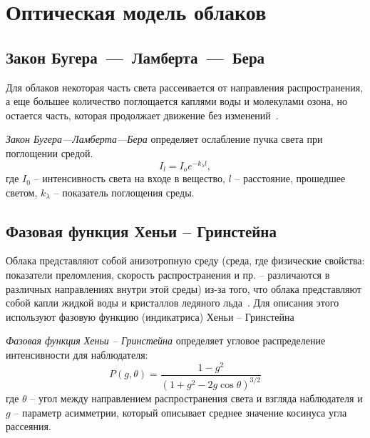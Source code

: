 \section{Оптическая модель облаков}
\subsection{Закон Бугера~---~Ламберта~---~Бера}
Для облаков некоторая часть света рассеивается от направления распространения, а еще большее количество поглощается каплями воды и молекулами озона, но остается часть, которая продолжает движение без изменений~\cite{guerrilla_volumetric_cloudscapes_2023, sym10040125}.

\textit{Закон Бугера---Ламберта---Бера} определяет ослабление пучка света при поглощении средой.
\begin{equation}
	\label{eq:beers-law}
	I_l=I_{o}e^{-k_{\lambda }l},
\end{equation} где 
{$I_{0}$} -- интенсивность света на входе в вещество, 
$l$ -- расстояние, прошедшее светом,
$k_\lambda$ -- показатель поглощения среды.

\subsection{Фазовая функция Хеньи -- Гринстейна}
Облака представляют собой анизотропную среду (среда, где физические свойства: показатели преломления, скорость распространения и пр. -- различаются в различных направлениях внутри этой среды) из-за того, что облака представляют собой капли жидкой воды и кристаллов ледяного льда~\cite{windahl_real_time_2018}. Для описания этого используют фазовую функцию (индикатриса) Хеньи -- Гринстейна~\cite{guerrilla_volumetric_cloudscapes_2023, sym10040125}

\textit{Фазовая функция Хеньи -- Гринстейна} определяет угловое распределение интенсивности для наблюдателя:
\begin{equation}
	\label{eq:henyey-greenstein}
	P(g, \theta) = \frac{1 - g^2}{(1 + g^2 - 2g \cos\theta)^{3/2}}
\end{equation} где 
$\theta$ --  угол между направлением распространения света и взгляда наблюдателя и $g$ -- параметр асимметрии, который описывает среднее значение косинуса угла рассеяния.

